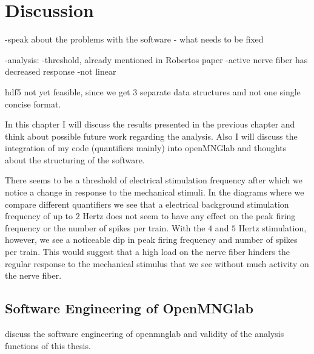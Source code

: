 \chapter{Discussion}
-speak about the problems with the software
- what needs to be fixed


-analysis:
-threshold, already mentioned in Robertos paper
-active nerve fiber has decreased response
-not linear

hdf5 not yet feasible, since we get 3 separate data structures and not one single concise format.


In this chapter I will discuss the results presented in the previous chapter and think about possible future work regarding the analysis. Also I will discuss the integration of my code (quantifiers mainly) into openMNGlab and thoughts about the structuring of the software.

There seems to be a threshold of electrical stimulation frequency after which we notice a change in response to the mechanical stimuli. In the diagrams where we compare different quantifiers we see that a electrical background stimulation frequency of up to $2$ Hertz does not seem to have any effect on the peak firing frequency or the number of spikes per train. With the $4$ and $5$ Hertz stimulation, however, we see a noticeable dip in peak firing frequency and number of spikes per train. This would suggest that a high load on the nerve fiber hinders the regular response to the mechanical stimulus that we see without much activity on the nerve fiber.

\section{Software Engineering of OpenMNGlab}
discuss the software engineering of openmnglab and validity of the analysis functions of this thesis.

